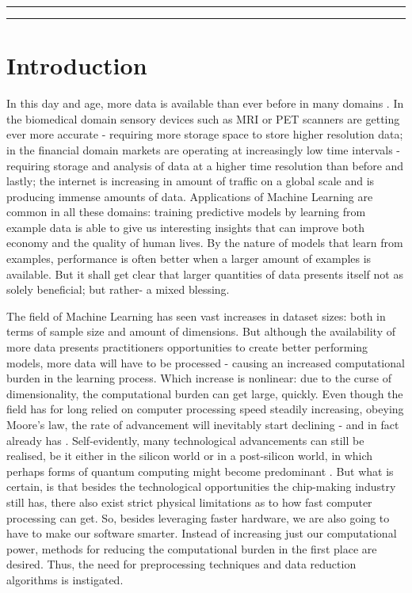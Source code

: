 \documentclass{article}
\begin{document}


\hrule
\begin{abstract}
\end{abstract}
\hrule

\tableofcontents

\newpage
\section{Introduction}\label{section:introduction}
In this day and age, more data is available than ever before in many domains \citep{sagiroglu_big_2013}. In the biomedical domain sensory devices such as MRI or PET scanners are getting ever more accurate - requiring more storage space to store higher resolution data; in the financial domain markets are operating at increasingly low time intervals - requiring storage and analysis of data at a higher time resolution than before and lastly; the internet is increasing in amount of traffic on a global scale and is producing immense amounts of data. Applications of Machine Learning are common in all these domains: training predictive models by learning from example data is able to give us interesting insights that can improve both economy and the quality of human lives. By the nature of models that learn from examples, performance is often better when a larger amount of examples is available. But it shall get clear that larger quantities of data presents itself not as solely beneficial; but rather- a mixed blessing.

The field of Machine Learning has seen vast increases in dataset sizes: both in terms of sample size and amount of dimensions. But although the availability of more data presents practitioners opportunities to create better performing models, more data will have to be processed - causing an increased computational burden in the learning process. Which increase is nonlinear: due to the curse of dimensionality, the computational burden can get large, quickly. Even though the field has for long relied on computer processing speed steadily increasing, obeying Moore's law, the rate of advancement will inevitably start declining - and in fact already has \citep{theis_end_2017}. Self-evidently, many technological advancements can still be realised, be it either in the silicon world or in a post-silicon world, in which perhaps forms of quantum computing might become predominant \citep{britt_high-performance_2017}. But what is certain, is that besides the technological opportunities the chip-making industry still has, there also exist strict physical limitations as to how fast computer processing can get. So, besides leveraging faster hardware, we are also going to have to make our software smarter. Instead of increasing just our computational power, methods for reducing the computational burden in the first place are desired. Thus, the need for preprocessing techniques and data reduction algorithms is instigated.
\end{document}
